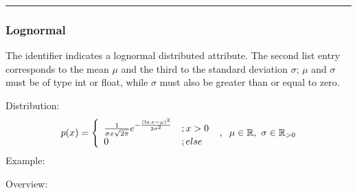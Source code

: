 \documentclass[letterpaper,10pt,english]{sphinxmanual}
\begin{document}
\bigskip\hrule\bigskip



\subsubsection{Lognormal}
\label{\detokenize{source/Interface_files/attribute_values:lognormal}}\label{\detokenize{source/Interface_files/attribute_values:id8}}
\sphinxAtStartPar
The identifier  indicates a lognormal distributed attribute. The second list entry corresponds to the mean
\(\mu\) and the third to the standard deviation \(\sigma\); \(\mu\) and \(\sigma\) must be of type int
or float, while \(\sigma\) must also be greater than or equal to zero.

\sphinxAtStartPar
Distribution:
\begin{equation*}
\begin{split}p(x) = \left\{\begin{array}{ll} \frac{1}{\sigma x \sqrt{2\pi}}e^{-\frac{(\ln{x}-\mu)^{2}}{2\sigma^{2}}} & ;x > 0 \\
                     0 & ;else\end{array}\right.\ ,\hspace{0.2cm} \mu\in\mathbb{R},\ \sigma\in\mathbb{R}_{>0}\end{split}
\end{equation*}
\sphinxAtStartPar
Example:

\begin{sphinxVerbatim}[commandchars=\\\{\}]
 \PYG{p}{[}\PYG{p}{]}
\end{sphinxVerbatim}


\sphinxAtStartPar
Overview:
\end{document}
